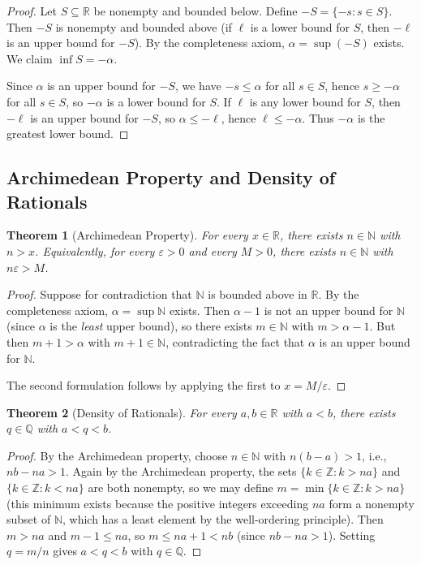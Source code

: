 \documentclass[11pt,a4paper]{article}
\theoremstyle{definition}
\theoremstyle{plain}
\newtheorem{theorem}{Theorem}[section]
\theoremstyle{remark}
\newcommand{\R}{\mathbb{R}}
\newcommand{\N}{\mathbb{N}}
\newcommand{\Q}{\mathbb{Q}}
\newcommand{\Z}{\mathbb{Z}}
\begin{document}
\begin{proof}
Let $S \subseteq \R$ be nonempty and bounded below. Define
$-S = \{-s : s \in S\}$. Then $-S$ is nonempty and bounded above
(if $\ell$ is a lower bound for $S$, then $-\ell$ is an upper bound for $-S$).
By the completeness axiom, $\alpha = \sup(-S)$ exists. We claim $\inf S = -\alpha$.

Since $\alpha$ is an upper bound for $-S$, we have $-s \le \alpha$ for all $s \in S$,
hence $s \ge -\alpha$ for all $s \in S$, so $-\alpha$ is a lower bound for $S$.
If $\ell$ is any lower bound for $S$, then $-\ell$ is an upper bound for $-S$,
so $\alpha \le -\ell$, hence $\ell \le -\alpha$. Thus $-\alpha$ is the greatest
lower bound.
\end{proof}

\subsection{Archimedean Property and Density of Rationals}
\label{subsec:archimedean}

\begin{theorem}[Archimedean Property]
\label{thm:archimedean}
For every $x \in \R$, there exists $n \in \N$ with $n > x$.
Equivalently, for every $\varepsilon > 0$ and every $M > 0$, there exists
$n \in \N$ with $n\varepsilon > M$.
\end{theorem}

\begin{proof}
Suppose for contradiction that $\N$ is bounded above in $\R$. By the completeness
axiom, $\alpha = \sup \N$ exists. Then $\alpha - 1$ is not an upper bound for $\N$
(since $\alpha$ is the \emph{least} upper bound), so there exists $m \in \N$ with
$m > \alpha - 1$. But then $m + 1 > \alpha$ with $m + 1 \in \N$, contradicting the
fact that $\alpha$ is an upper bound for $\N$.

The second formulation follows by applying the first to $x = M/\varepsilon$.
\end{proof}

\begin{theorem}[Density of Rationals]
\label{thm:density_Q}
For every $a, b \in \R$ with $a < b$, there exists $q \in \Q$ with $a < q < b$.
\end{theorem}

\begin{proof}
By the Archimedean property, choose $n \in \N$ with $n(b - a) > 1$, i.e.,
$nb - na > 1$. Again by the Archimedean property, the sets
$\{k \in \Z : k > na\}$ and $\{k \in \Z : k < na\}$ are both nonempty, so we may
define $m = \min\{k \in \Z : k > na\}$ (this minimum exists because the positive
integers exceeding $na$ form a nonempty subset of $\N$, which has a least element
by the well-ordering principle). Then $m > na$ and $m - 1 \le na$, so
$m \le na + 1 < nb$ (since $nb - na > 1$). Setting $q = m/n$ gives
$a < q < b$ with $q \in \Q$.
\end{proof}
\end{document}
